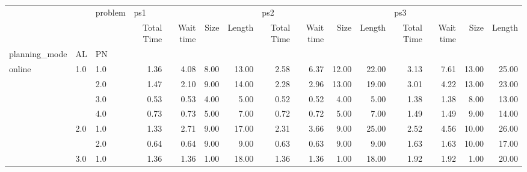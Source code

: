 \begin{tabular}{lllrrrrrrrrrrrr}
\toprule
       &     & problem & \multicolumn{4}{l}{ps1} & \multicolumn{4}{l}{ps2} & \multicolumn{4}{l}{ps3} \\
       &     & {} & Total Time & Wait time & Size & Length & Total Time & Wait time &  Size & Length & Total Time & Wait time &  Size & Length \\
planning\_mode & AL & PN &            &           &      &        &            &           &       &        &            &           &       &        \\
\midrule
online & 1.0 & 1.0 &       1.36 &      4.08 & 8.00 &  13.00 &       2.58 &      6.37 & 12.00 &  22.00 &       3.13 &      7.61 & 13.00 &  25.00 \\
       &     & 2.0 &       1.47 &      2.10 & 9.00 &  14.00 &       2.28 &      2.96 & 13.00 &  19.00 &       3.01 &      4.22 & 13.00 &  23.00 \\
       &     & 3.0 &       0.53 &      0.53 & 4.00 &   5.00 &       0.52 &      0.52 &  4.00 &   5.00 &       1.38 &      1.38 &  8.00 &  13.00 \\
       &     & 4.0 &       0.73 &      0.73 & 5.00 &   7.00 &       0.72 &      0.72 &  5.00 &   7.00 &       1.49 &      1.49 &  9.00 &  14.00 \\
       & 2.0 & 1.0 &       1.33 &      2.71 & 9.00 &  17.00 &       2.31 &      3.66 &  9.00 &  25.00 &       2.52 &      4.56 & 10.00 &  26.00 \\
       &     & 2.0 &       0.64 &      0.64 & 9.00 &   9.00 &       0.63 &      0.63 &  9.00 &   9.00 &       1.63 &      1.63 & 10.00 &  17.00 \\
       & 3.0 & 1.0 &       1.36 &      1.36 & 1.00 &  18.00 &       1.36 &      1.36 &  1.00 &  18.00 &       1.92 &      1.92 &  1.00 &  20.00 \\
\bottomrule
\end{tabular}
